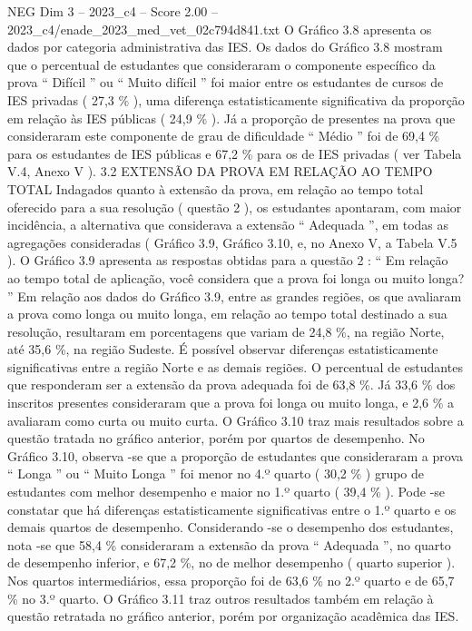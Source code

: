 \begin{textsample}{NEG Dim 3 – 2023\_c4 – Score 2.00 – 2023\_c4/enade\_2023\_med\_vet\_02c794d841.txt}
O Gráfico 3.8 apresenta os dados por categoria administrativa das IES.
Os dados do Gráfico 3.8 mostram que o percentual de estudantes que consideraram o componente específico da prova “ Difícil ” ou “ Muito difícil ” foi maior entre os estudantes de cursos de IES privadas ( 27,3 \% ), uma diferença estatisticamente significativa da proporção em relação às IES públicas ( 24,9 \% ).
Já a proporção de presentes na prova que consideraram este componente de grau de dificuldade “ Médio ” foi de 69,4 \% para os estudantes de IES públicas e 67,2 \% para os de IES privadas ( ver Tabela V.4, Anexo V ). 3.2 EXTENSÃO DA PROVA EM RELAÇÃO AO TEMPO TOTAL Indagados quanto à extensão da prova, em relação ao tempo total oferecido para a sua resolução ( questão 2 ), os estudantes apontaram, com maior incidência, a alternativa que considerava a extensão “ Adequada ”, em todas as agregações consideradas ( Gráfico 3.9, Gráfico 3.10, e, no Anexo V, a Tabela V.5 ).
O Gráfico 3.9 apresenta as respostas obtidas para a questão 2 : “ Em relação ao tempo total de aplicação, você considera que a prova foi longa ou muito longa? ” Em relação aos dados do Gráfico 3.9, entre as grandes regiões, os que avaliaram a prova como longa ou muito longa, em relação ao tempo total destinado a sua resolução, resultaram em porcentagens que variam de 24,8 \%, na região Norte, até 35,6 \%, na região Sudeste.
É possível observar diferenças estatisticamente significativas entre a região Norte e as demais regiões.
O percentual de estudantes que responderam ser a extensão da prova adequada foi de 63,8 \%.
Já 33,6 \% dos inscritos presentes consideraram que a prova foi longa ou muito longa, e 2,6 \% a avaliaram como curta ou muito curta.
O Gráfico 3.10 traz mais resultados sobre a questão tratada no gráfico anterior, porém por quartos de desempenho.
No Gráfico 3.10, observa -se que a proporção de estudantes que consideraram a prova “ Longa ” ou “ Muito Longa ” foi menor no 4.º quarto ( 30,2 \% ) grupo de estudantes com melhor desempenho e maior no 1.º quarto ( 39,4 \% ).
Pode -se constatar que há diferenças estatisticamente significativas entre o 1.º quarto e os demais quartos de desempenho.
Considerando -se o desempenho dos estudantes, nota -se que 58,4 \% consideraram a extensão da prova “ Adequada ”, no quarto de desempenho inferior, e 67,2 \%, no de melhor desempenho ( quarto superior ).
Nos quartos intermediários, essa proporção foi de 63,6 \% no 2.º quarto e de 65,7 \% no 3.º quarto.
O Gráfico 3.11 traz outros resultados também em relação à questão retratada no gráfico anterior, porém por organização acadêmica das IES.

\end{textsample}

